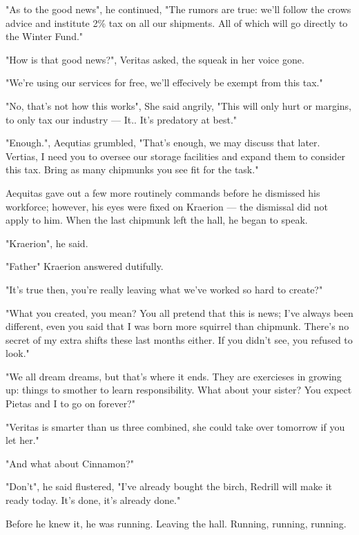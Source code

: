 \documentclass[smalldemyvopaper,11pt,twoside,onecolumn,openright,extrafontsizes]{memoir}
\begin{document}
"As to the good news", he continued, "The rumors are true: we'll follow the crows advice and institute 2\% tax on all our shipments. All of which will go directly to the Winter Fund."

"How is that good news?", Veritas asked, the squeak in her voice gone.

"We're using our services for free, we'll effecively be exempt from this tax."

"No, that's not how this works", She said angrily, "This will only hurt or margins, to only tax our industry — It.. It's predatory at best."

"Enough.", Aequtias grumbled, "That's enough, we may discuss that later. Vertias, I need you to oversee our storage facilities and expand them to consider this tax. Bring as many chipmunks you see fit for the task." 

Aequitas gave out a few more routinely commands before he dismissed his workforce; however, his eyes were fixed on Kraerion — the dismissal did not apply to him. When the last chipmunk left the hall, he began to speak.

"Kraerion", he said.

"Father" Kraerion answered dutifully.

"It's true then, you're really leaving what we've worked so hard to create?"

"What you created, you mean? You all pretend that this is news; I've always been different, even you said that I was born more squirrel than chipmunk. There's no secret of my extra shifts these last months either. If you didn't see, you refused to look."

"We all dream dreams, but that's where it ends. They are exercieses in growing up: things to smother to learn responsibility. What about your sister? You expect Pietas and I to go on forever?"

"Veritas is smarter than us three combined, she could take over tomorrow if you let her."

"And what about Cinnamon?"

"Don't", he said flustered, "I've already bought the birch, Redrill will make it ready today. It's done, it's already done."

Before he knew it, he was running. Leaving the hall. Running, running, running.



\end{document}
